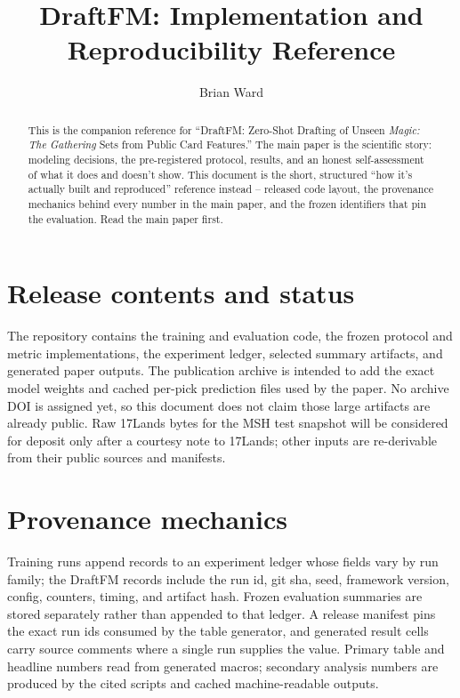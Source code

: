 \documentclass[11pt]{article}
\title{\bfseries DraftFM: Implementation and Reproducibility Reference}
\author{Brian Ward}
\date{}
\newcommand{\seventeenlands}{17Lands}
\newcommand{\mtg}{\emph{Magic: The Gathering}}
\begin{document}
\maketitle

\begin{abstract}
This is the companion reference for ``DraftFM: Zero-Shot Drafting of
Unseen \mtg{} Sets from Public Card Features.'' The main paper is the
scientific story: modeling decisions, the pre-registered protocol,
results, and an honest self-assessment of what it does and doesn't show.
This document is the short, structured ``how it's actually built and
reproduced'' reference instead -- released code layout, the provenance
mechanics behind every number in the main paper, and the frozen
identifiers that pin the evaluation. Read the main paper first.
\end{abstract}

\section{Release contents and status}
\label{sec:released}

The repository contains the training and evaluation code, the frozen
protocol and metric implementations, the experiment ledger, selected
summary artifacts, and generated paper outputs. The publication archive
is intended to add the exact model weights and cached per-pick prediction
files used by the paper. No archive DOI is assigned yet, so this document
does not claim those large artifacts are already public. Raw
\seventeenlands{} bytes for the MSH test snapshot will be considered for
deposit only after a courtesy note to \seventeenlands{}; other inputs are
re-derivable from their public sources and manifests.

\section{Provenance mechanics}
\label{sec:ledger}

Training runs append records to an experiment ledger whose fields vary by
run family; the DraftFM records include the run id, git sha, seed,
framework version, config, counters, timing, and artifact hash. Frozen
evaluation summaries are stored separately rather than appended to that
ledger. A release manifest pins the exact run ids consumed by the table
generator, and generated result cells carry source comments where a single
run supplies the value. Primary table and headline numbers read from
generated macros; secondary analysis numbers are produced by the cited
scripts and cached machine-readable outputs.
\end{document}
